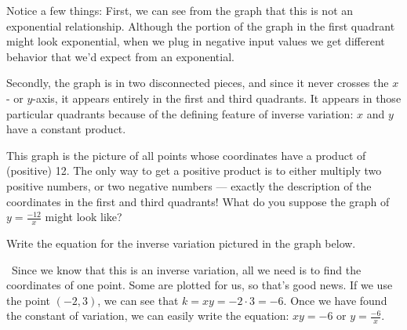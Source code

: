 Notice a few things: First, we can see from the graph that this is not an exponential relationship. Although the portion of the graph in the first quadrant might look exponential, when we plug in negative input values we get different behavior that we'd expect from an exponential.

Secondly, the graph is in two disconnected pieces, and since it never crosses the $x$- or $y$-axis, it appears entirely in the first and third quadrants. It appears in those particular quadrants because of the defining feature of inverse variation: $x$ and $y$ have a constant product.

This graph is the picture of all points whose coordinates have a product of (positive) 12. The only way to get a positive product is to either multiply two positive numbers, or two negative numbers --- exactly the description of the coordinates in the first and third quadrants! What do you suppose the graph of $y=\frac{-12}{x}$ might look like?

\begin{boxex}
Write the equation for the inverse variation pictured in the graph below.

\begin{center}
\end{center}


\exsoln\ Since we know that this is an inverse variation, all we need is to find the coordinates of one point. Some are plotted for us, so that's good news. If we use the point $(-2, 3)$, we can see that $k = xy = -2\cdot3 = -6$. Once we have found the constant of variation, we can easily write the equation: $xy=-6$ or $y=\frac{-6}{x}$.
\end{boxex}

